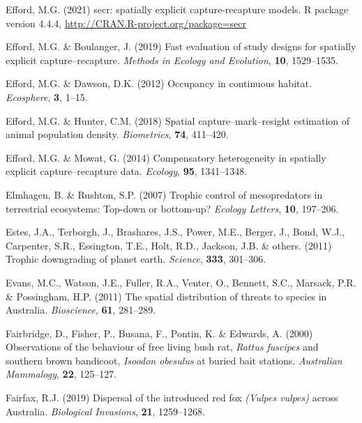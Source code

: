 \documentclass[11pt,a4paper,titlepage,twoside,openright]{style/unimelbthesis}
\begin{document}
\begin{mainmatter}
\leavevmode\hypertarget{ref-efford2021secr}{}%
Efford, M.G. (2021) secr: spatially explicit capture-recapture models. R package version 4.4.4, \url{http://CRAN.R-project.org/package=secr}

\leavevmode\hypertarget{ref-efford2019fast}{}%
Efford, M.G. \& Boulanger, J. (2019) Fast evaluation of study designs for spatially explicit capture--recapture. \emph{Methods in Ecology and Evolution}, \textbf{10}, 1529--1535.

\leavevmode\hypertarget{ref-efford2012occupancy}{}%
Efford, M.G. \& Dawson, D.K. (2012) Occupancy in continuous habitat. \emph{Ecosphere}, \textbf{3}, 1--15.

\leavevmode\hypertarget{ref-efford2018spatial}{}%
Efford, M.G. \& Hunter, C.M. (2018) Spatial capture--mark--resight estimation of animal population density. \emph{Biometrics}, \textbf{74}, 411--420.

\leavevmode\hypertarget{ref-efford2014compensatory}{}%
Efford, M.G. \& Mowat, G. (2014) Compensatory heterogeneity in spatially explicit capture--recapture data. \emph{Ecology}, \textbf{95}, 1341--1348.

\leavevmode\hypertarget{ref-elmhagen2007trophic}{}%
Elmhagen, B. \& Rushton, S.P. (2007) Trophic control of mesopredators in terrestrial ecosystems: Top-down or bottom-up? \emph{Ecology Letters}, \textbf{10}, 197--206.

\leavevmode\hypertarget{ref-estes2011trophic}{}%
Estes, J.A., Terborgh, J., Brashares, J.S., Power, M.E., Berger, J., Bond, W.J., Carpenter, S.R., Essington, T.E., Holt, R.D., Jackson, J.B. \& others. (2011) Trophic downgrading of planet earth. \emph{Science}, \textbf{333}, 301--306.

\leavevmode\hypertarget{ref-evans2011spatial}{}%
Evans, M.C., Watson, J.E., Fuller, R.A., Venter, O., Bennett, S.C., Marsack, P.R. \& Possingham, H.P. (2011) The spatial distribution of threats to species in Australia. \emph{Bioscience}, \textbf{61}, 281--289.

\leavevmode\hypertarget{ref-fairbridge2000observations}{}%
Fairbridge, D., Fisher, P., Busana, F., Pontin, K. \& Edwards, A. (2000) Observations of the behaviour of free living bush rat, \emph{Rattus fuscipes} and southern brown bandicoot, \emph{Isoodon obesulus} at buried bait stations. \emph{Australian Mammalogy}, \textbf{22}, 125--127.

\leavevmode\hypertarget{ref-fairfax2019dispersal}{}%
Fairfax, R.J. (2019) Dispersal of the introduced red fox \emph{(Vulpes vulpes)} across Australia. \emph{Biological Invasions}, \textbf{21}, 1259--1268.


\end{mainmatter}
\end{document}
